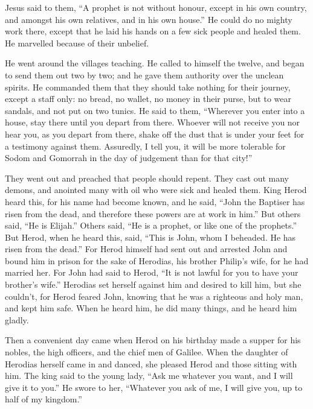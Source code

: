  Jesus said to them, ``A prophet is not without honour,
except in his own country, and amongst his own relatives, and in his own
house.''  He could do no mighty work there, except that he
laid his hands on a few sick people and healed them.  He
marvelled because of their unbelief.

He went around the villages teaching.  He called to himself
the twelve, and began to send them out two by two; and he gave them
authority over the unclean spirits.  He commanded them that
they should take nothing for their journey, except a staff only: no
bread, no wallet, no money in their purse,  but to wear
sandals, and not put on two tunics.  He said to them,
``Wherever you enter into a house, stay there until you depart from
there.  Whoever will not receive you nor hear you, as you
depart from there, shake off the dust that is under your feet for a
testimony against them. Assuredly, I tell you, it will be more tolerable
for Sodom and Gomorrah in the day of judgement than for that city!''

 They went out and preached that people should repent.
 They cast out many demons, and anointed many with oil who
were sick and healed them.  King Herod heard this, for his
name had become known, and he said, ``John the Baptiser has risen from
the dead, and therefore these powers are at work in him.'' 
But others said, ``He is Elijah.'' Others said, ``He is a prophet, or
like one of the prophets.''  But Herod, when he heard this,
said, ``This is John, whom I beheaded. He has risen from the dead.''
 For Herod himself had sent out and arrested John and bound
him in prison for the sake of Herodias, his brother Philip's wife, for
he had married her.  For John had said to Herod, ``It is
not lawful for you to have your brother's wife.''  Herodias
set herself against him and desired to kill him, but she couldn't,
 for Herod feared John, knowing that he was a righteous and
holy man, and kept him safe. When he heard him, he did many things, and
he heard him gladly.

 Then a convenient day came when Herod on his birthday made
a supper for his nobles, the high officers, and the chief men of
Galilee.  When the daughter of Herodias herself came in and
danced, she pleased Herod and those sitting with him. The king said to
the young lady, ``Ask me whatever you want, and I will give it to you.''
 He swore to her, ``Whatever you ask of me, I will give
you, up to half of my kingdom.''

